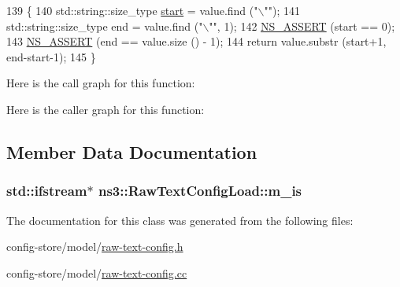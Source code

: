 \begin{DoxyCode}
139 \{
140   std::string::size\_type \hyperlink{namespacevisualizer_1_1core_a2a35e5d8a34af358b508dac8635754e0}{start} = value.find (\textcolor{stringliteral}{"\(\backslash\)""});
141   std::string::size\_type end = value.find (\textcolor{stringliteral}{"\(\backslash\)""}, 1);
142   \hyperlink{assert_8h_a6dccdb0de9b252f60088ce281c49d052}{NS\_ASSERT} (start == 0);
143   \hyperlink{assert_8h_a6dccdb0de9b252f60088ce281c49d052}{NS\_ASSERT} (end == value.size () - 1);
144   \textcolor{keywordflow}{return} value.substr (start+1, end-start-1);
145 \}
\end{DoxyCode}


Here is the call graph for this function\+:




Here is the caller graph for this function\+:




\subsection{Member Data Documentation}
\subsubsection[{\texorpdfstring{m\+\_\+is}{m_is}}]{\setlength{\rightskip}{0pt plus 5cm}std\+::ifstream$\ast$ ns3\+::\+Raw\+Text\+Config\+Load\+::m\+\_\+is\hspace{0.3cm}{\ttfamily [private]}}\hypertarget{classns3_1_1RawTextConfigLoad_aab67f5cf3b865b62112dc97e86bc24f6}{}\label{classns3_1_1RawTextConfigLoad_aab67f5cf3b865b62112dc97e86bc24f6}


The documentation for this class was generated from the following files\+:\begin{DoxyCompactItemize}
\item 
config-\/store/model/\hyperlink{raw-text-config_8h}{raw-\/text-\/config.\+h}\item 
config-\/store/model/\hyperlink{raw-text-config_8cc}{raw-\/text-\/config.\+cc}\end{DoxyCompactItemize}
